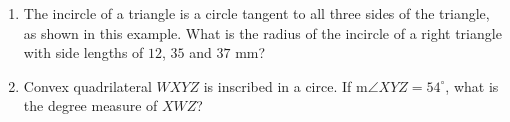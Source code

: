 \documentclass{article}
\begin{document}
\begin{multicols}{2}
\begin{enumerate}
\begin{center}
            \end{center}
            \vspace{3cm}
        \item The incircle of a triangle is a circle tangent to all three sides of the triangle, as shown in this example.
            What is the radius of the incircle of a right triangle with side lengths of $12$, $35$ and $37$ mm?
            \begin{center}
            \end{center}
            \vspace{3cm}
        \item Convex quadrilateral $WXYZ$ is inscribed in a circe.
            If m$\angle XYZ = 54^{\circ}$, what is the degree measure of $XWZ$?
            \vspace{3cm}
    \end{enumerate}
\end{multicols}
\end{document}
